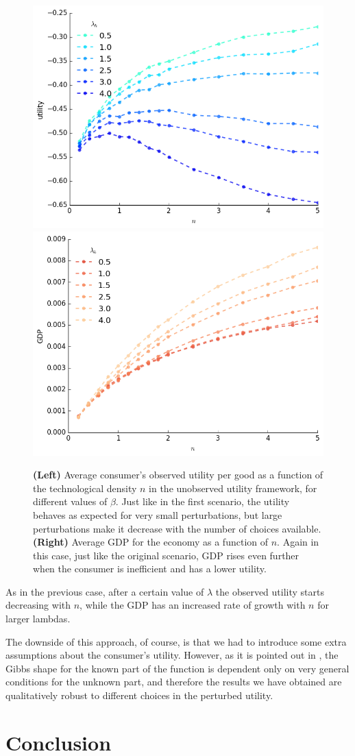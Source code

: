 \begin{figure}[!ht]
  \centering
  \includegraphics[width=.45\textwidth]{figs_inef/stoc_utility.png}
  \includegraphics[width=.45\textwidth]{figs_inef/stoc_GDP.png}
  \caption{\textbf{(Left)} Average consumer's observed utility per good as a
    function of the technological density $n$ in the unobserved utility framework, for
    different values of $\beta$. Just like in the first scenario, the utility behaves as expected for very small perturbations, but large perturbations make it decrease with the number of choices available. \textbf{(Right)} Average GDP for the
    economy as a function of $n$. Again in this case, just like the original scenario, GDP rises even further when the consumer is inefficient and has a lower utility.}
  \label{fig:u_and_GDP_stoc}
\end{figure}

As in the previous case, after a certain value of $\lambda$ the
observed utility starts decreasing with $n$, while the GDP has an
increased rate of growth with $n$ for larger lambdas.

The downside of this approach, of course, is that we had to introduce
some extra assumptions about the consumer's utility. However,
as it is pointed out in \cite{Marsili13}, the Gibbs shape for
the known part of the function is dependent only on very general
conditions for the unknown part, and therefore the results we have
obtained are qualitatively robust to different choices in the
perturbed utility.

\section{Conclusion}

